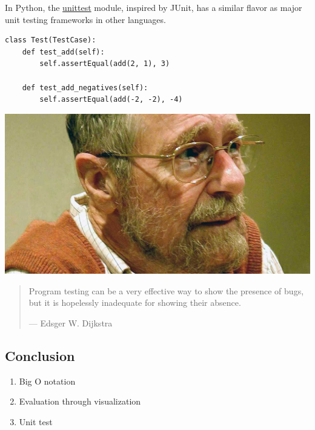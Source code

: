 \documentclass[aspectratio=169, 14pt]{beamer}
\begin{document}
\begin{frame}[fragile]
In Python, the \href{https://docs.python.org/3/library/unittest.html}{unittest} module, inspired by JUnit, has a similar flavor as major unit testing frameworks in other languages.
\begin{verbatim}
class Test(TestCase):
    def test_add(self):
        self.assertEqual(add(2, 1), 3)

    def test_add_negatives(self):
        self.assertEqual(add(-2, -2), -4)    
\end{verbatim}

\end{frame}


\begin{frame}
    \begin{center}
        \includegraphics[height=.4\paperheight]{week2/dijkstra}
    \end{center}

   \begin{quote}
    Program testing can be a very effective way to show the presence of bugs, but it is hopelessly inadequate for showing their absence.
    \begin{flushright}
        --- Edsger W. Dijkstra
    \end{flushright}
   \end{quote} 

\end{frame}

\begin{frame}
    \section{\textcolor{darkmidnightblue}{Conclusion}}

    \begin{enumerate}
        \item Big O notation
        \item Evaluation through visualization
        \item Unit test
    \end{enumerate}
\end{frame}
\end{document}
